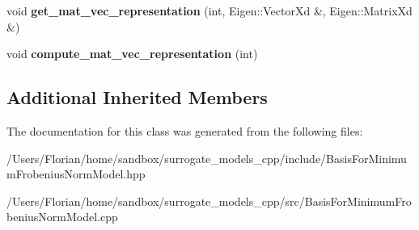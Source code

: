 \begin{DoxyCompactItemize}
\item 
void {\bfseries get\+\_\+mat\+\_\+vec\+\_\+representation} (int, Eigen\+::\+Vector\+Xd \&, Eigen\+::\+Matrix\+Xd \&)\hypertarget{class_basis_for_minimum_frobenius_norm_model_a24cbc9e38a64abeaada0bb871151cb8b}{}\label{class_basis_for_minimum_frobenius_norm_model_a24cbc9e38a64abeaada0bb871151cb8b}

\item 
void {\bfseries compute\+\_\+mat\+\_\+vec\+\_\+representation} (int)\hypertarget{class_basis_for_minimum_frobenius_norm_model_a985ac3c7257b6ea548a570d8d6fd4e99}{}\label{class_basis_for_minimum_frobenius_norm_model_a985ac3c7257b6ea548a570d8d6fd4e99}

\end{DoxyCompactItemize}
\subsection*{Additional Inherited Members}


The documentation for this class was generated from the following files\+:\begin{DoxyCompactItemize}
\item 
/\+Users/\+Florian/home/sandbox/surrogate\+\_\+models\+\_\+cpp/include/Basis\+For\+Minimum\+Frobenius\+Norm\+Model.\+hpp\item 
/\+Users/\+Florian/home/sandbox/surrogate\+\_\+models\+\_\+cpp/src/Basis\+For\+Minimum\+Frobenius\+Norm\+Model.\+cpp\end{DoxyCompactItemize}
